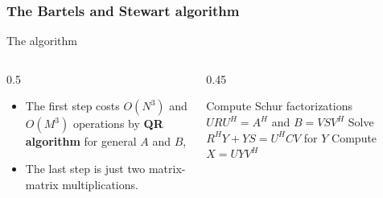 \documentclass[aspectratio=169,xcolor=dvipsnames]{beamer}
\begin{document}
	\subsubsection{The Bartels and Stewart algorithm}

	\begin{frame}{The \cite{10.1145/361573.361582} algorithm}
	
	\begin{columns}
	\begin{column}{0.5\columnwidth}
	\begin{itemize}
		\item[\faMoneyBillWave]<2-> The first step costs $O(N^3)$ and $O(M^3)$ operations by \textbf{QR algorithm} for general $A$ and $B$,
		\item[\faMoneyBillWave]<3-> The last step is just two matrix-matrix multiplications.
	\end{itemize}
	\end{column}
	\begin{column}{0.45\columnwidth}
	\begin{algorithm}[H]
	\alert<2>{Compute Schur factorizations $U R U^H  = A^H$ and $B = V S V^H$}\;
	\alert<4-11>{Solve $R^H Y + Y S = U^H C V$ for $Y$}\;
	\alert<3>{Compute $X = U Y V^H$}\; 
	\end{algorithm}
	\end{column}
	\end{columns}
	\vfill
	

\end{frame}
\end{document}
